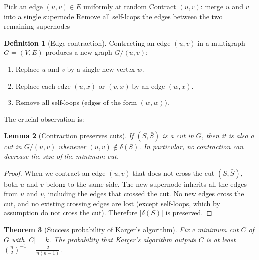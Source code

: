 \documentclass[twoside,12pt]{book}
\theoremstyle{plain}
\newtheorem{theorem}{Theorem}[chapter]
\newtheorem{lemma}[theorem]{Lemma}
\theoremstyle{definition}
\newtheorem{definition}[theorem]{Definition}
\theoremstyle{remark}
\begin{document}
\begin{algorithm}
\caption{Karger's Contraction Algorithm}
\label{alg:karger}
\begin{algorithmic}[1]
        \State Pick an edge $(u, v) \in E$ uniformly at random
        \State Contract $(u, v)$: merge $u$ and $v$ into a single supernode
        \State Remove all self-loops
    \EndWhile
    \State \Return the edges between the two remaining supernodes
\EndFunction
\end{algorithmic}
\end{algorithm}

\begin{definition}[Edge contraction]
Contracting an edge $(u, v)$ in a multigraph $G = (V, E)$ produces a new graph $G / (u,v)$:
\begin{enumerate}[nosep]
    \item Replace $u$ and $v$ by a single new vertex $w$.
    \item Replace each edge $(u, x)$ or $(v, x)$ by an edge $(w, x)$.
    \item Remove all self-loops (edges of the form $(w, w)$).
\end{enumerate}
\end{definition}

The crucial observation is:

\begin{lemma}[Contraction preserves cuts]
\label{lem:contraction-preserves}
If $(S, \bar{S})$ is a cut in $G$, then it is also a cut in $G / (u,v)$ whenever $(u,v) \notin \delta(S)$. In particular, no contraction can decrease the size of the minimum cut.
\end{lemma}

\begin{proof}
When we contract an edge $(u, v)$ that does not cross the cut $(S, \bar{S})$, both $u$ and $v$ belong to the same side. The new supernode inherits all the edges from $u$ and $v$, including the edges that crossed the cut. No new edges cross the cut, and no existing crossing edges are lost (except self-loops, which by assumption do not cross the cut). Therefore $|\delta(S)|$ is preserved.
\end{proof}

\begin{theorem}[Success probability of Karger's algorithm]
\label{thm:karger-prob}
Fix a minimum cut $C$ of $G$ with $|C| = k$. The probability that Karger's algorithm outputs $C$ is at least $\binom{n}{2}^{-1} = \frac{2}{n(n-1)}$.
\end{theorem}
\end{document}
